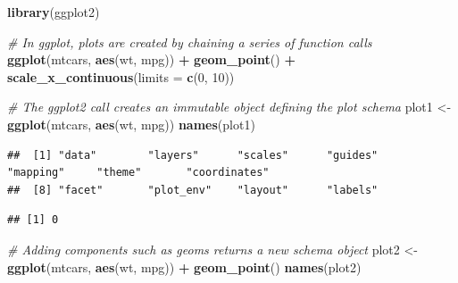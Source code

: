 \documentclass[
]{book}
\newenvironment{Shaded}{\begin{snugshade}}{\end{snugshade}}
\newcommand{\AttributeTok}[1]{\textcolor[rgb]{0.13,0.29,0.53}{#1}}
\newcommand{\CommentTok}[1]{\textcolor[rgb]{0.56,0.35,0.01}{\textit{#1}}}
\newcommand{\DecValTok}[1]{\textcolor[rgb]{0.00,0.00,0.81}{#1}}
\newcommand{\FunctionTok}[1]{\textcolor[rgb]{0.13,0.29,0.53}{\textbf{#1}}}
\newcommand{\NormalTok}[1]{#1}
\newcommand{\OtherTok}[1]{\textcolor[rgb]{0.56,0.35,0.01}{#1}}
\newcommand{\SpecialCharTok}[1]{\textcolor[rgb]{0.81,0.36,0.00}{\textbf{#1}}}
\theoremstyle{definition}
\theoremstyle{definition}
\theoremstyle{definition}
\theoremstyle{definition}
\theoremstyle{remark}
\begin{document}
\begin{Shaded}
\begin{Highlighting}[]
\FunctionTok{library}\NormalTok{(ggplot2)}

\CommentTok{\# In ggplot, plots are created by chaining a series of function calls}
\FunctionTok{ggplot}\NormalTok{(mtcars, }\FunctionTok{aes}\NormalTok{(wt, mpg)) }\SpecialCharTok{+}
  \FunctionTok{geom\_point}\NormalTok{() }\SpecialCharTok{+}
  \FunctionTok{scale\_x\_continuous}\NormalTok{(}\AttributeTok{limits =} \FunctionTok{c}\NormalTok{(}\DecValTok{0}\NormalTok{, }\DecValTok{10}\NormalTok{))}
\end{Highlighting}
\end{Shaded}

\begin{Shaded}
\begin{Highlighting}[]
\CommentTok{\# The ggplot2 call creates an immutable object defining the plot schema}
\NormalTok{plot1 }\OtherTok{\textless{}{-}} \FunctionTok{ggplot}\NormalTok{(mtcars, }\FunctionTok{aes}\NormalTok{(wt, mpg))}
\FunctionTok{names}\NormalTok{(plot1)}
\end{Highlighting}
\end{Shaded}

\begin{verbatim}
##  [1] "data"        "layers"      "scales"      "guides"      "mapping"     "theme"       "coordinates"
##  [8] "facet"       "plot_env"    "layout"      "labels"
\end{verbatim}

\begin{Shaded}
\end{Shaded}

\begin{verbatim}
## [1] 0
\end{verbatim}

\begin{Shaded}
\begin{Highlighting}[]
\CommentTok{\# Adding components such as geoms returns a new schema object}
\NormalTok{plot2 }\OtherTok{\textless{}{-}} \FunctionTok{ggplot}\NormalTok{(mtcars, }\FunctionTok{aes}\NormalTok{(wt, mpg)) }\SpecialCharTok{+} \FunctionTok{geom\_point}\NormalTok{()}
\FunctionTok{names}\NormalTok{(plot2)}
\end{Highlighting}
\end{Shaded}
\end{document}
